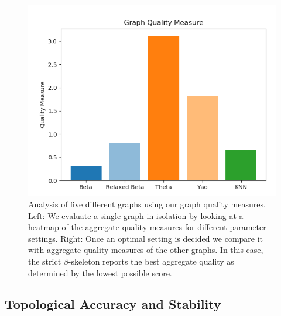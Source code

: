 \begin{figure}[htbp]
    \includegraphics[width=0.48\linewidth]{figs/chap7/optimal_quality_measures.png}
    \caption{Analysis of five different graphs using our graph quality measures.
    Left: We evaluate a single graph in isolation by looking at a heatmap of the aggregate quality measures for different parameter settings.
    Right: Once an optimal setting is decided we compare it with aggregate quality measures of the other graphs.
    In this case, the strict $\beta$-skeleton reports the best aggregate quality as determined by the lowest possible score.}
    \label{fig:graph_quality}
\end{figure}

\subsection{Topological Accuracy and Stability}

